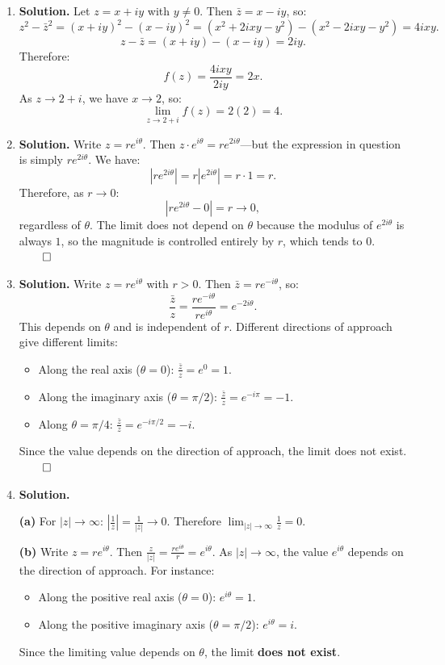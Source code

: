\begin{enumerate}
\item \textbf{Solution.}
Let $z = x + iy$ with $y \neq 0$. Then $\bar{z} = x - iy$, so:
\[
z^2 - \bar{z}^2 = (x+iy)^2 - (x-iy)^2 = (x^2 + 2ixy - y^2) - (x^2 - 2ixy - y^2) = 4ixy.
\]
\[
z - \bar{z} = (x+iy) - (x-iy) = 2iy.
\]
Therefore:
\[
f(z) = \frac{4ixy}{2iy} = 2x.
\]
As $z \to 2 + i$, we have $x \to 2$, so:
\[
\lim_{z \to 2+i} f(z) = 2(2) = 4.
\]

\item \textbf{Solution.}
Write $z = re^{i\theta}$. Then $z \cdot e^{i\theta} = re^{2i\theta}$---but the expression in question is simply $re^{2i\theta}$. We have:
\[
|re^{2i\theta}| = r|e^{2i\theta}| = r \cdot 1 = r.
\]
Therefore, as $r \to 0$:
\[
|re^{2i\theta} - 0| = r \to 0,
\]
regardless of $\theta$. The limit does not depend on $\theta$ because the modulus of $e^{2i\theta}$ is always $1$, so the magnitude is controlled entirely by $r$, which tends to $0$. $\qed$

\item \textbf{Solution.}
Write $z = re^{i\theta}$ with $r > 0$. Then $\bar{z} = re^{-i\theta}$, so:
\[
\frac{\bar{z}}{z} = \frac{re^{-i\theta}}{re^{i\theta}} = e^{-2i\theta}.
\]
This depends on $\theta$ and is independent of $r$. Different directions of approach give different limits:
\begin{itemize}
    \item Along the real axis ($\theta = 0$): $\frac{\bar{z}}{z} = e^0 = 1$.
    \item Along the imaginary axis ($\theta = \pi/2$): $\frac{\bar{z}}{z} = e^{-i\pi} = -1$.
    \item Along $\theta = \pi/4$: $\frac{\bar{z}}{z} = e^{-i\pi/2} = -i$.
\end{itemize}
Since the value depends on the direction of approach, the limit does not exist. $\qed$

\item \textbf{Solution.}

\textbf{(a)} For $|z| \to \infty$: $\left|\frac{1}{z}\right| = \frac{1}{|z|} \to 0$. Therefore $\displaystyle\lim_{|z| \to \infty} \frac{1}{z} = 0.$

\textbf{(b)} Write $z = re^{i\theta}$. Then $\frac{z}{|z|} = \frac{re^{i\theta}}{r} = e^{i\theta}$. As $|z| \to \infty$, the value $e^{i\theta}$ depends on the direction of approach. For instance:
\begin{itemize}
    \item Along the positive real axis ($\theta = 0$): $e^{i\theta} = 1$.
    \item Along the positive imaginary axis ($\theta = \pi/2$): $e^{i\theta} = i$.
\end{itemize}
Since the limiting value depends on $\theta$, the limit \textbf{does not exist}.


\end{enumerate}
